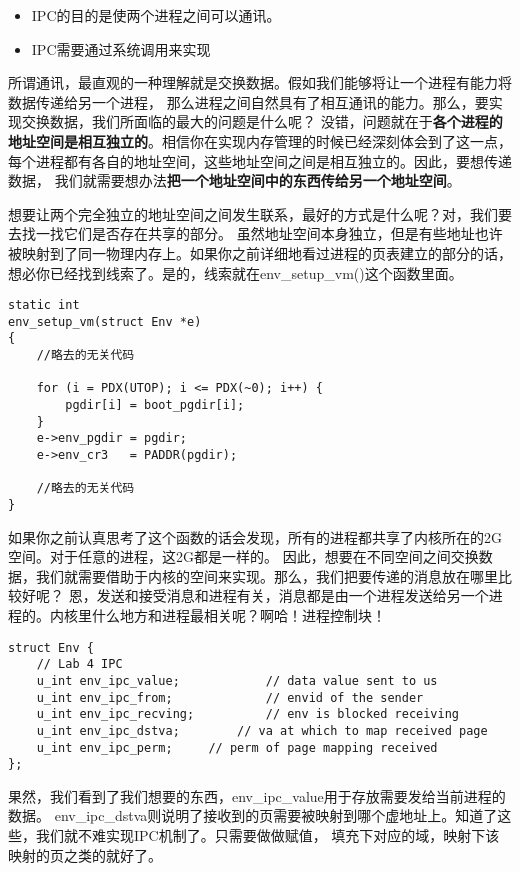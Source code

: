 \begin{itemize}
  \item IPC的目的是使两个进程之间可以通讯。
  \item IPC需要通过系统调用来实现
\end{itemize}

所谓通讯，最直观的一种理解就是交换数据。假如我们能够将让一个进程有能力将数据传递给另一个进程，
那么进程之间自然具有了相互通讯的能力。那么，要实现交换数据，我们所面临的最大的问题是什么呢？
没错，问题就在于\textbf{各个进程的地址空间是相互独立的}。相信你在实现内存管理的时候已经深刻体会到了这一点，
每个进程都有各自的地址空间，这些地址空间之间是相互独立的。因此，要想传递数据，
我们就需要想办法\textbf{把一个地址空间中的东西传给另一个地址空间}。

想要让两个完全独立的地址空间之间发生联系，最好的方式是什么呢？对，我们要去找一找它们是否存在共享的部分。
虽然地址空间本身独立，但是有些地址也许被映射到了同一物理内存上。如果你之前详细地看过进程的页表建立的部分的话，
想必你已经找到线索了。是的，线索就在env\_setup\_vm()这个函数里面。

\begin{verbatim}
static int
env_setup_vm(struct Env *e)
{
    //略去的无关代码
    
    for (i = PDX(UTOP); i <= PDX(~0); i++) {
        pgdir[i] = boot_pgdir[i];
    }
    e->env_pgdir = pgdir;
    e->env_cr3   = PADDR(pgdir);
    
    //略去的无关代码
}
\end{verbatim}

如果你之前认真思考了这个函数的话会发现，所有的进程都共享了内核所在的2G空间。对于任意的进程，这2G都是一样的。
因此，想要在不同空间之间交换数据，我们就需要借助于内核的空间来实现。那么，我们把要传递的消息放在哪里比较好呢？
恩，发送和接受消息和进程有关，消息都是由一个进程发送给另一个进程的。内核里什么地方和进程最相关呢？啊哈！进程控制块！

\begin{verbatim}
struct Env {
    // Lab 4 IPC
    u_int env_ipc_value;            // data value sent to us
    u_int env_ipc_from;             // envid of the sender
    u_int env_ipc_recving;          // env is blocked receiving
    u_int env_ipc_dstva;        // va at which to map received page
    u_int env_ipc_perm;     // perm of page mapping received
};
\end{verbatim}

果然，我们看到了我们想要的东西，env\_ipc\_value用于存放需要发给当前进程的数据。
env\_ipc\_dstva则说明了接收到的页需要被映射到哪个虚地址上。知道了这些，我们就不难实现IPC机制了。只需要做做赋值，
填充下对应的域，映射下该映射的页之类的就好了。

